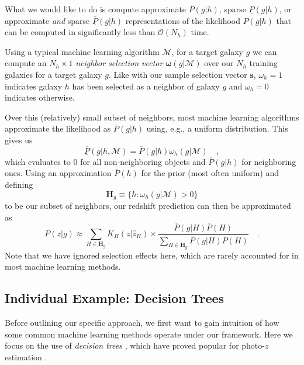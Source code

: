 \documentclass[a4paper,fleqn,usenatbib,english]{mnras}
\newcommand{\pz}{photo-$z$} %
\begin{document}
What we would like to do is compute approximate $\overline{P}(g|h)$, sparse $\underline{P}(g|h)$, or approximate \textit{and} sparse $\overline{\underline{P}}(g|h)$ representations of the likelihood $P(g|h)$ that can be computed in significantly less than $\mathcal{O}(N_h)$ time.

Using a typical machine learning algorithm $\mathcal{M}$, for a target galaxy $g$ we can compute an $N_h \times 1$ \textit{neighbor selection vector} $\boldsymbol{\omega}(g|\mathcal{M})$ over our $N_h$ training galaxies for a target galaxy $g$. Like with our sample selection vector $\mathbf{s}$, $\omega_h=1$ indicates galaxy $h$ has been selected as a neighbor of galaxy $g$ and $\omega_h=0$ indicates otherwise.

Over this (relatively) small subset of neighbors, most machine learning algorithms approximate the likelihood as $\overline{P}(g|h)$ using, e.g., a uniform distribution. This gives us
\begin{equation}
\underline{\overline{P}}(g|h,\mathcal{M}) = \overline{P}(g|h)\omega_h(g|\mathcal{M}) \quad ,
\end{equation}
which evaluates to $0$ for all non-neighboring objects and $\overline{P}(g|h)$ for neighboring ones. Using an approximation $\overline{P}(h)$ for the prior (most often uniform) and defining 
\begin{equation}
\mathbf{H}_g \equiv \lbrace h : \omega_h(g|\mathcal{M})>0\rbrace
\end{equation}
to be our subset of neighbors, our redshift prediction can then be approximated as 
\begin{equation}
P(z|g)\approx \sum_{H\in\mathbf{H}_g} K_H(z|\hat{z}_H) \times \frac{\overline{P}(g|H)\overline{P}(H)}{\sum_{H\in\mathbf{H}_g} \overline{P}(g|H)\overline{P}(H)} \quad .
\end{equation}
Note that we have ignored selection effects here, which are rarely accounted for in most machine learning methods.

\subsection{Individual Example: Decision Trees}
\label{subsec:dt_bayes_approx}

Before outlining our specific approach, we first want to gain intuition of how some common machine learning methods operate under our framework. Here we focus on the use of \textit{decision trees} \citep{breiman84}, which have proved popular for {\pz} estimation \citep{gerdes+10,carrascokindbrunner13,hoyle+15}. 
\end{document}
